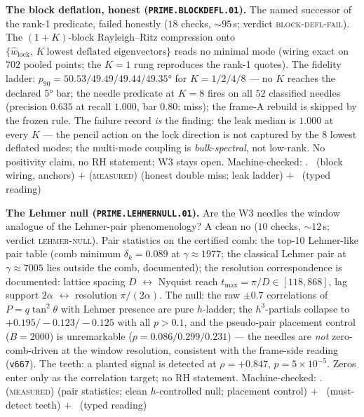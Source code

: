 \par\smallskip\noindent\textbf{The block deflation, honest
(\texttt{PRIME.BLOCKDEFL.01}).}
The named successor of the rank-1 predicate, failed honestly ($18$
checks, ${\sim}95$\,s; verdict \textsc{block-defl-fail}).  The
$(1{+}K)$-block Rayleigh--Ritz compression onto
$\{\hat w_{\mathrm{lock}},\,K\ \text{lowest deflated eigenvectors}\}$
reads no minimal mode (wiring exact on $702$ pooled points; the
$K=1$ rung reproduces the rank-1 quotes).  The fidelity ladder:
$p_{90}=50.53/49.49/49.44/49.35°$ for $K=1/2/4/8$ --- no $K$ reaches
the declared $5°$ bar; the needle predicate at $K=8$ fires on all
$52$ classified needles (precision $0.635$ at recall $1.000$, bar
$0.80$: miss); the frame-A rebuild is skipped by the frozen rule.
The failure record \emph{is} the finding: the leak median is $1.000$
at every $K$ --- the pencil action on the lock direction is not
captured by the $8$ lowest deflated modes; the multi-mode coupling
is \emph{bulk-spectral}, not low-rank.  No positivity claim, no RH
statement; W3 stays open.
Machine-checked: .
\mE\ (block wiring, anchors) $+$ (\textsc{measured}) (honest double
miss; leak ladder) $+$ \mC\ (typed reading)
\par\smallskip


\par\smallskip\noindent\textbf{The Lehmer null
(\texttt{PRIME.LEHMERNULL.01}).}
Are the W3 needles the window analogue of the Lehmer-pair
phenomenology?  A clean no ($10$ checks, ${\sim}12$\,s; verdict
\textsc{lehmer-null}).  Pair statistics on the certified comb: the
top-10 Lehmer-like pair table (comb minimum $\delta_k=0.089$ at
$\gamma\approx1977$; the classical Lehmer pair at
$\gamma\approx7005$ lies outside the comb, documented); the
resolution correspondence is documented: lattice spacing $D$
$\leftrightarrow$ Nyquist reach $t_{\max}=\pi/D\in[118,868]$, lag
support $2\alpha$ $\leftrightarrow$ resolution $\pi/(2\alpha)$.  The
null: the raw $\pm0.7$ correlations of $P=q\tan^2\theta$ with Lehmer
presence are pure $h$-ladder; the $h^3$-partials collapse to
$+0.195/-0.123/-0.125$ with all $p>0.1$, and the pseudo-pair
placement control ($B=2000$) is unremarkable ($p=0.086/0.299/0.231$)
--- the needles are \emph{not} zero-comb-driven at the window
resolution, consistent with the frame-side reading (\texttt{v667}).
The teeth: a planted signal is detected at $\rho=+0.847$,
$p=5\times10^{-5}$.  Zeros enter only as the correlation target; no
RH statement.
Machine-checked: .
(\textsc{measured}) (pair statistics; clean $h$-controlled null;
placement control) $+$ \mE\ (must-detect teeth) $+$ \mC\ (typed
reading)
\par\smallskip


